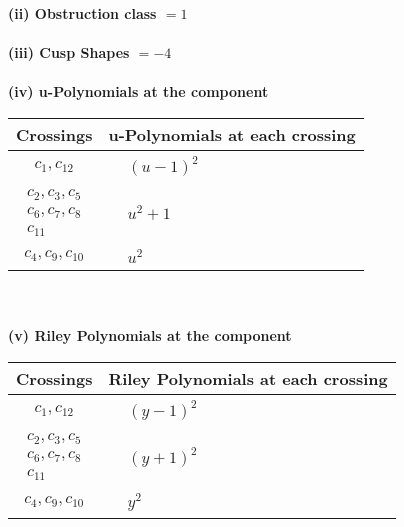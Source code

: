 \documentclass[1p]{elsarticle_modified}
\theoremstyle{definition}
\begin{document}
\flushleft \textbf{(ii) Obstruction class $= 1$}\\~\\
\flushleft \textbf{(iii) Cusp Shapes $= -4$}\\~\\
\newpage\renewcommand{\arraystretch}{1}
\flushleft \textbf{(iv) u-Polynomials at the component}\newline \\
\begin{tabular}{m{50pt}|m{274pt}}
Crossings & \hspace{64pt}u-Polynomials at each crossing \\
\hline $$\begin{aligned}c_{1},c_{12}\end{aligned}$$&$\begin{aligned}
&(u-1)^2
\end{aligned}$\\
\hline $$\begin{aligned}c_{2},c_{3},c_{5}\\c_{6},c_{7},c_{8}\\c_{11}\end{aligned}$$&$\begin{aligned}
&u^2+1
\end{aligned}$\\
\hline $$\begin{aligned}c_{4},c_{9},c_{10}\end{aligned}$$&$\begin{aligned}
&u^2
\end{aligned}$\\
\hline
\end{tabular}\\~\\
\newpage\renewcommand{\arraystretch}{1}
\flushleft \textbf{(v) Riley Polynomials at the component}\newline \\
\begin{tabular}{m{50pt}|m{274pt}}
Crossings & \hspace{64pt}Riley Polynomials at each crossing \\
\hline $$\begin{aligned}c_{1},c_{12}\end{aligned}$$&$\begin{aligned}
&(y-1)^2
\end{aligned}$\\
\hline $$\begin{aligned}c_{2},c_{3},c_{5}\\c_{6},c_{7},c_{8}\\c_{11}\end{aligned}$$&$\begin{aligned}
&(y+1)^2
\end{aligned}$\\
\hline $$\begin{aligned}c_{4},c_{9},c_{10}\end{aligned}$$&$\begin{aligned}
&y^2
\end{aligned}$\\
\hline
\end{tabular}\\~\\
\end{document}
